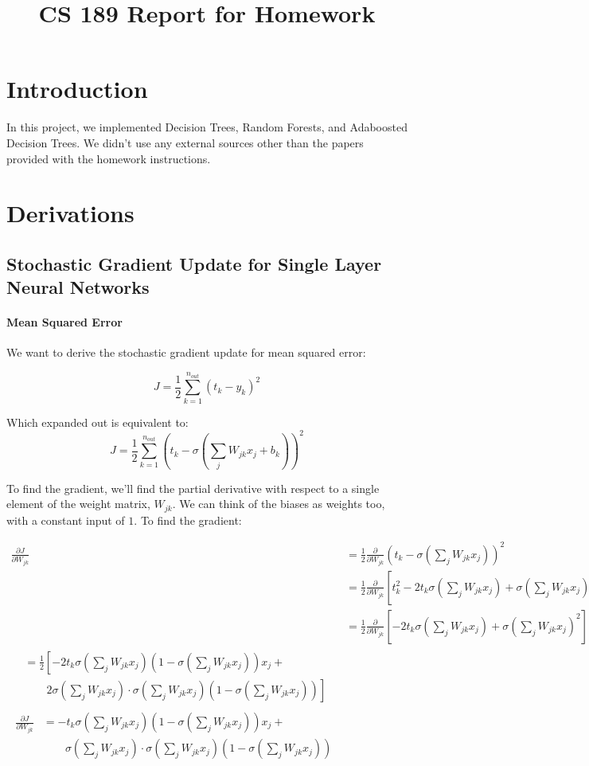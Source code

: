 \documentclass[11pt]{article}
\title{CS 189 Report for Homework \Homework}
\author{\Name}
\begin{document}
\maketitle

\section{Introduction}

In this project, we implemented Decision Trees, Random Forests, and Adaboosted Decision Trees. We didn't use any external sources other than the papers provided with the homework instructions. 

\section{Derivations}

\subsection{Stochastic Gradient Update for Single Layer Neural Networks}

\paragraph{Mean Squared Error} We want to derive the stochastic gradient update for mean squared error:

\[
	J = \frac{1}{2}\sum_{k=1}^{n_{out}}\left( t_k - y_k \right) ^2
\]

Which expanded out is equivalent to:
\[
	J = \frac{1}{2}\sum_{k=1}^{n_{out}}\left( t_k - \sigma \left( \sum_j W_{jk} x_j + b_k \right) \right) ^2
\]

To find the gradient, we'll find the partial derivative with respect to a single element of the weight matrix, $W_{jk}$. We can think of the biases as weights too, with a constant input of $1$. To find the gradient:

\newcommand{\sfn}{\sigma \left( \sum_j W_{jk} x_j\right)}
\begin{align}
\frac{\partial J}{\partial W_{jk}} &= \frac{1}{2}\frac{\partial}{\partial W_{jk}}\left(
t_k - \sfn
\right) ^2 \\
&= \frac{1}{2} \frac{\partial}{\partial W_{jk}} \left[ t_k^2 - 2t_k\sfn + \sfn^2 \right] \\
&= \frac{1}{2} \frac{\partial}{\partial W_{jk}} \left[- 2t_k\sfn + \sfn^2 \right] \\
\begin{split}
&= \frac{1}{2} \left[
-2t_k \sfn \left( 1 - \sfn \right) x_j \right.+ \\
& \qquad \left.2\sfn \cdot \sfn \left( 1 - \sfn \right)
\right]
\end{split} \\
 \label{eq:partialJ}
\begin{split}
\frac{\partial J}{\partial W_{jk}} &= 
-t_k \sfn \left( 1 - \sfn \right) x_j + \\
& \qquad \sfn \cdot \sfn \left( 1 - \sfn \right)
\end{split}
\end{align}
\end{document}
